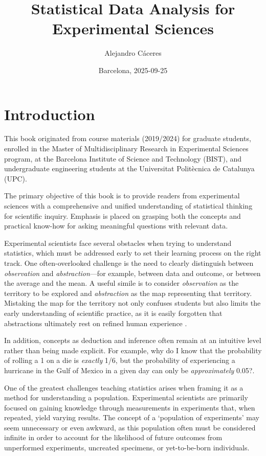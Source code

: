 \documentclass[
]{book}
\title{Statistical Data Analysis
for
Experimental Sciences}
\author{Alejandro Cáceres}
\date{Barcelona, 2025-09-25}
\begin{document}
\maketitle

{
\setcounter{tocdepth}{1}
\tableofcontents
}
\hypertarget{introduction}{%
\chapter{Introduction}\label{introduction}}

This book originated from course materials (2019/2024) for graduate students, enrolled in the Master of Multidisciplinary Research in Experimental Sciences program, at the Barcelona Institute of Science and Technology (BIST), and undergraduate engineering students at the Universitat Politècnica de Catalunya (UPC).

The primary objective of this book is to provide readers from experimental sciences with a comprehensive and unified understanding of statistical thinking for scientific inquiry. Emphasis is placed on grasping both the concepts and practical know-how for asking meaningful questions with relevant data.

Experimental scientists face several obstacles when trying to understand statistics, which must be addressed early to set their learning process on the right track. One often-overlooked challenge is the need to clearly distinguish between \emph{observation} and \emph{abstraction}---for example, between data and outcome, or between the average and the mean. A useful simile is to consider \emph{observation} as the territory to be explored and \emph{abstraction} as the map representing that territory. Mistaking the map for the territory not only confuses students but also limits the early understanding of scientific practice, as it is easily forgotten that abstractions ultimately rest on refined human experience \citep{Frank2024}.

In addition, concepts as deduction and inference often remain at an intuitive level rather than being made explicit. For example, why do I know that the probability of rolling a 1 on a die is \emph{exactly} 1/6, but the probability of experiencing a hurricane in the Gulf of Mexico in a given day can only be \emph{approximately} 0.05?.

One of the greatest challenges teaching statistics arises when framing it as a method for understanding a population. Experimental scientists are primarily focused on gaining knowledge through measurements in experiments that, when repeated, yield varying results. The concept of a `population of experiments' may seem unnecessary or even awkward, as this population often must be considered infinite in order to account for the likelihood of future outcomes from unperformed experiments, uncreated specimens, or yet-to-be-born individuals.
\end{document}
